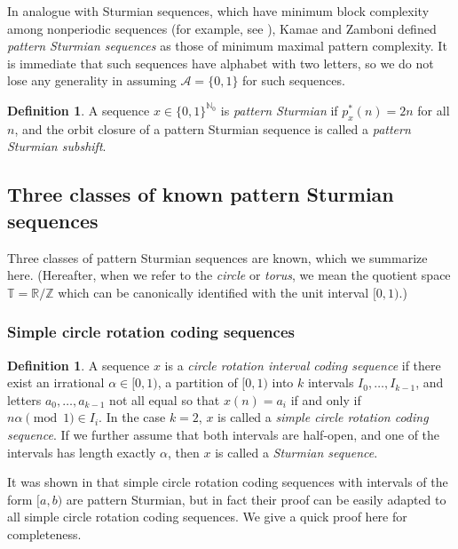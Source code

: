 \documentclass[11pt,reqno]{amsart}
\theoremstyle{definition}
\newtheorem{definition}[theorem]{Definition}
\theoremstyle{plain}
\newcommand{\A}{\mathcal{A}}
\newcommand{\Z}{\mathbb{Z}}
\newcommand{\N}{\mathbb{N}}
\newcommand{\R}{\mathbb{R}}
\newcommand{\T}{\mathbb{T}}
\newcommand{\AuthornoteR}[2]{{\sf\small\color{blue}{[#1: #2]}}}
\newcommand{\rp}{\AuthornoteR{R}}
\begin{document}
In analogue with Sturmian sequences, which have minimum block complexity among nonperiodic sequences (for example, see \cite{fogg}), Kamae and Zamboni defined \emph{pattern Sturmian sequences} as those of minimum maximal pattern complexity. It is immediate that such sequences have alphabet with two letters, so we do not lose any generality in assuming 
$\A = \{0,1\}$ for such sequences. 

\begin{definition}
    A sequence $x \in \{0,1\}^{\N_0}$ is \emph{pattern Sturmian} if $p^*_x(n) = 2n$ for all $n$, and the orbit closure of a pattern Sturmian sequence is called a \emph{pattern Sturmian subshift}.
\end{definition}

\subsection{Three classes of known pattern Sturmian sequences}


Three classes of pattern Sturmian sequences are known, which we summarize here. (Hereafter, when we refer to the \emph{circle} or \emph{torus}, we mean the quotient space $\T = \R/\Z$ which can be canonically identified with the unit interval $[0, 1)$.)


\subsubsection{Simple circle rotation coding sequences}

\begin{definition}\label{def:coding}
A sequence $x$ is a \emph{circle rotation interval coding sequence} if there exist an irrational $\alpha \in [0,1)$, a partition of $[0,1)$ into $k$ intervals $I_0, \ldots, I_{k-1}$, and letters $a_0, \ldots, a_{k-1}$ not all equal so that
$x(n) = a_i$ if and only if $n\alpha \pmod 1 \in I_i$. In the case $k = 2$, $x$ is called a \emph{simple circle rotation coding sequence}. If we further assume that both intervals are half-open, and one of the intervals has length exactly $\alpha$, then $x$ is called a \emph{Sturmian sequence}.
\end{definition}

It was shown in \cite{Kamae-Zamboni-sequence_entropy} that simple circle rotation coding sequences with intervals of the form $[a,b)$ are pattern Sturmian, but in fact their proof can be easily adapted to all simple circle rotation coding sequences. We give a quick proof here for completeness. %
\end{document}
